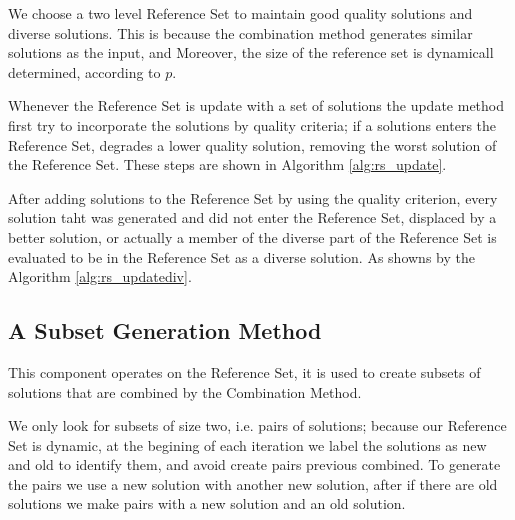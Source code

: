 We choose
a two level Reference Set
to maintain
good quality solutions
and diverse solutions.
This is
because the combination method
generates similar solutions as the input,
and Moreover,
the size of the reference set is dynamicall determined,
according to $p$.

Whenever the Reference Set is update
with a set of solutions
the update method
first try to incorporate the solutions
by quality criteria;
if a solutions enters the Reference Set,
degrades a lower quality solution,
removing the worst solution of the Reference Set.
These steps are shown in Algorithm \ref{alg:rs_update}.


After adding solutions to the Reference Set
by using the quality criterion,
every solution taht was generated
and did not enter the Reference Set,
displaced by a better solution,
or actually
a member of the diverse part of the Reference Set
is evaluated to be in the Reference Set
as a diverse solution.
As showns by the Algorithm \ref{alg:rs_updatediv}.

%

\subsection{A Subset Generation Method}
This component operates on the Reference Set,
it is used to create subsets
of solutions that are combined
by the Combination Method.

We only look for subsets of size two,
i.e. pairs of solutions;
because our Reference Set is dynamic,
at the begining of each iteration
we label the solutions as new and old
to identify them,
and avoid create pairs previous combined.
To generate the pairs
we use
a new solution with another new solution,
after
if there are old solutions
we make pairs
with a new solution
and an old solution.

